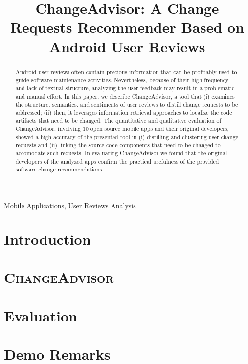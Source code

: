 \documentclass[conference]{IEEEtran}
\newcommand{\tool}[0]{\textsc{ChangeAdvisor}}
\begin{document}
\title{ChangeAdvisor: A Change Requests Recommender Based on Android User Reviews}


\maketitle
\begin{abstract}
Android user reviews often contain precious information that can be profitably used to guide software maintenance activities. Nevertheless, because of their high frequency and lack of textual structure, analyzing the user feedback may result in a problematic and manual effort. In this paper, we describe ChangeAdvisor, a tool that (i) examines the structure, semantics, and sentiments of user reviews to distill change requests to be addressed; (ii) then, it leverages information retrieval approaches to localize the code artifacts that need to be changed. The quantitative and qualitative evaluation of ChangeAdvisor, involving 10 open source mobile apps and their original developers, showed a high accuracy of the presented tool in (i) distilling and clustering user change requests and (ii) linking the source code components that need to be changed to accomodate such requests. In evaluating ChangeAdvisor we found that the original developers of the analyzed apps confirm the practical usefulness of the provided software change recommendations.
\end{abstract}

\begin{IEEEkeywords}
\footnotesize
Mobile Applications, User Reviews Analysis
\end{IEEEkeywords}

\section{Introduction}
\label{sec:intro}
 

\section{\tool{}} 
\label{sec:design}


\section{Evaluation}
\label{sec:evaluation}



\section{Demo Remarks}
\label{sec:remarks}



  
\end{document}
